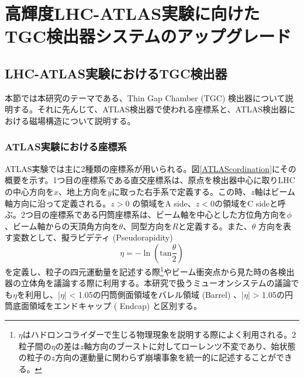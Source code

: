 \chapter{高輝度LHC-ATLAS実験に向けたTGC検出器システムのアップグレード}
\label{chap_TGC}




\section{LHC-ATLAS実験におけるTGC検出器}
本節では本研究のテーマである、Thin Gap Chamber (TGC) 検出器について説明する。それに先んじて、ATLAS検出器で使われる座標系と、ATLAS検出器における磁場構造について説明する。

\subsection{ATLAS実験における座標系}
\label{subsec_ATLAScordination}
ATLAS実験では主に2種類の座標系が用いられる。図\ref{ATLAScordination}にその概要を示す。1つ目の座標系である直交座標系は、原点を検出器中心に取りLHCの中心方向を$x$、地上方向を$y$に取った右手系で定義する。この時、$z$軸はビーム軸方向に沿って定義される。$z>0$ の領域をA side、$z<0$の領域をC sideと呼ぶ。2つ目の座標系である円筒座標系は、ビーム軸を中心とした方位角方向を$\phi$、ビーム軸からの天頂角方向を$\theta$、同型方向を$R$と定義する。また、$\theta$ 方向を表す変数として、擬ラピデティ  (Pseudorapidity)
\begin{equation}
    \eta = -\ln(\mathrm{tan}\frac{\theta}{2})
\end{equation}
を定義し、粒子の四元運動量を記述する際\footnote{$\eta$はハドロンコライダーで生じる物理現象を説明する際によく利用される。2粒子間の$\eta$の差は$z$軸方向のブーストに対してローレンツ不変であり、始状態の粒子の$z$方向の運動量に関わらず崩壊事象を統一的に記述することができる。}やビーム衝突点から見た時の各検出器の立体角を議論する際に利用する。本研究で扱うミューオンシステムの議論でも$\eta$を利用し、|$\eta$| < 1.05の円筒側面領域をバレル領域 (Barrel) 、|$\eta$| > 1.05の円筒底面領域をエンドキャップ ( Endcap) と区別する。

